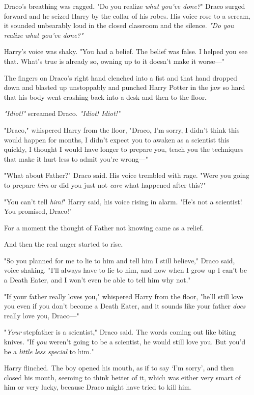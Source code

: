 Draco's breathing was ragged. "Do you realize \emph{what you've done?}" Draco
surged forward and he seized Harry by the collar of his robes. His voice rose
to a scream, it sounded unbearably loud in the closed classroom and the
silence. \emph{"Do you realize what you've done?"}

Harry's voice was shaky. "You had a belief. The belief was false. I helped you
see that. What's true is already so, owning up to it doesn't make it worse\mbox{---}"

The fingers on Draco's right hand clenched into a fist and that hand dropped
down and blasted up unstoppably and punched Harry Potter in the jaw so hard
that his body went crashing back into a desk and then to the floor.

\emph{"Idiot!"} screamed Draco. \emph{"Idiot! Idiot!"}

"Draco," whispered Harry from the floor, "Draco, I'm sorry, I didn't think this
would happen for months, I didn't expect you to awaken as a scientist this
quickly, I thought I would have longer to prepare you, teach you the techniques
that make it hurt less to admit you're wrong\mbox{---}"

"What about Father?" Draco said. His voice trembled with rage. "Were you going
to prepare \emph{him} or did you just not \emph{care} what happened after this?"

"You can't tell \emph{him!}" Harry said, his voice rising in alarm. "He's not a
scientist! You promised, Draco!"

For a moment the thought of Father not knowing came as a relief.

And then the real anger started to rise.

"So you planned for me to lie to him and tell him I still believe," Draco said,
voice shaking. "I'll always have to lie to him, and now when I grow up I can't
be a Death Eater, and I won't even be able to tell him why not."

"If your father really loves you," whispered Harry from the floor, "he'll still
love you even if you don't become a Death Eater, and it sounds like your father
\emph{does} really love you, Draco\mbox{---}"

"\emph{Your} stepfather is a scientist," Draco said. The words coming out like
biting knives. "If \emph{you} weren't going to be a scientist, he would still
love you. But you'd be a \emph{little less special} to him."

Harry flinched. The boy opened his mouth, as if to say `I'm sorry', and then
closed his mouth, seeming to think better of it, which was either very smart of
him or very lucky, because Draco might have tried to kill him.

